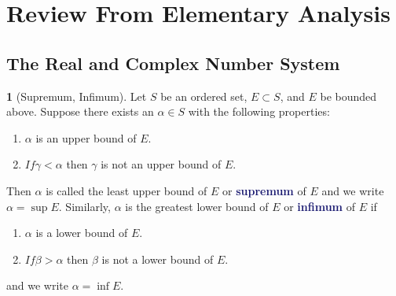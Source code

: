 \documentclass[11pt]{article}
\numberwithin{equation}{section}
\newcommand{\navy}[1]{\textcolor{MidnightBlue}{\bf #1}}
\theoremstyle{plain}
\theoremstyle{definition}
\newtheorem{definition}{\color{MidnightBlue}{\textbf{Definition}}}[section]
\newcommand{\1}{\mathbbm 1}
\begin{document}
\appendix

\section{Review From Elementary Analysis}

\subsection{The Real and Complex Number System}

\begin{definition}[Supremum, Infimum]
	Let $S$ be an ordered set, $E \subset S$, and $E$ be bounded above. Suppose there exists an $\alpha \in S$ with the following properties:
	\begin{enumerate}
		\item $\alpha$ is an upper bound of $E$.
		\item $If \gamma < \alpha$ then $\gamma$ is not an upper bound of $E$.
	\end{enumerate}
	Then $\alpha$ is called the least upper bound of $E$ or \navy{supremum} of $E$ and we write $\alpha = \sup E$. Similarly, $\alpha$ is the greatest lower bound of $E$ or \navy{infimum} of $E$ if 
	\begin{enumerate}
		\item $\alpha$ is a lower bound of $E$.
		\item $If \beta > \alpha$ then $\beta$ is not a lower bound of $E$.
	\end{enumerate}
	and we write $\alpha = \inf E$.
\end{definition}
\end{document}
